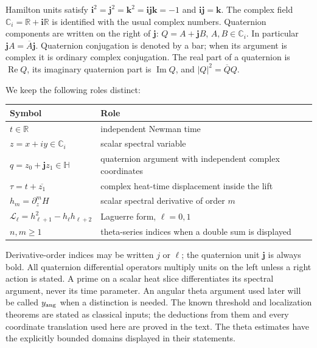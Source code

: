 \documentclass[11pt]{article}
\numberwithin{equation}{section}
\theoremstyle{definition}
\theoremstyle{remark}
\DeclareMathOperator{\Rea}{Re}
\DeclareMathOperator{\Ima}{Im}
\newcommand{\R}{\mathbb R}
\newcommand{\C}{\mathbb C}
\newcommand{\HH}{\mathbb H}
\newcommand{\ii}{\mathbf i}
\newcommand{\jj}{\mathbf j}
\newcommand{\kk}{\mathbf k}
\newcommand{\Lag}{\mathscr L}
\begin{document}
Hamilton units satisfy
$\ii^2=\jj^2=\kk^2=\ii\jj\kk=-1$ and $\ii\jj=\kk$.
The complex field $\C_i=\R+\ii\R$ is identified with the usual complex
numbers. Quaternion components are written on the right of $\jj$:
$Q=A+\jj B$, $A,B\in\C_i$. In particular
$\jj A=\overline A\jj$. Quaternion conjugation is denoted by a bar;
when its argument is complex it is ordinary complex conjugation.
The real part of a quaternion is $\Rea Q$, its imaginary quaternion
part is $\Ima Q$, and $|Q|^2=\overline QQ$.

We keep the following roles distinct:
\begin{center}
\begin{tabular}{@{}ll@{}}
\toprule
Symbol & Role \\
\midrule
$t\in\R$ & independent Newman time \\
$z=x+iy\in\C_i$ & scalar spectral variable \\
$q=z_0+\jj z_1\in\HH$ & quaternion argument with independent complex coordinates \\
$\tau=t+\overline{z_1}$ & complex heat-time displacement inside the lift \\
$h_m=\partial_z^mH$ & scalar spectral derivative of order $m$ \\
$\Lag_\ell=h_{\ell+1}^2-h_\ell h_{\ell+2}$ & Laguerre form, $\ell=0,1$ \\
$n,m\ge1$ & theta-series indices when a double sum is displayed \\
\bottomrule
\end{tabular}
\end{center}
Derivative-order indices may be written $j$ or $\ell$; the quaternion
unit $\jj$ is always bold. All quaternion differential operators multiply
units on the left unless
a right action is stated. A prime on a scalar heat slice differentiates
its spectral argument, never its time parameter. An angular theta
argument used later will be called $y_{\rm ang}$ when a distinction is
needed. The known threshold and localization theorems are stated as
classical inputs; the deductions from them and every coordinate
translation used here are proved in the text. The theta estimates have
the explicitly bounded domains displayed in their statements.


\end{document}
